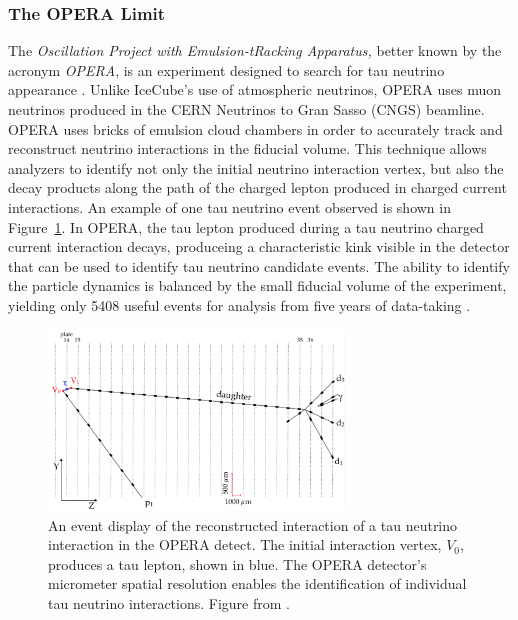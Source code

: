 \label{subsubsec:opera_limit}
\subsubsection{The OPERA Limit}
The \emph{Oscillation Project with Emulsion-tRacking Apparatus,} better known by the acronym \emph{OPERA}, is an experiment designed to search for tau neutrino appearance \cite{Description-OPERA}.
Unlike IceCube's use of atmospheric neutrinos, OPERA uses muon neutrinos produced in the CERN Neutrinos to Gran Sasso (CNGS) beamline.
OPERA uses bricks of emulsion cloud chambers in order to accurately track and reconstruct neutrino interactions in the fiducial volume.
This technique allows analyzers to identify not only the initial neutrino interaction vertex, but also the decay products along the path of the charged lepton produced in charged current interactions.
An example of one tau neutrino event observed is shown in Figure~\ref{fig:opera_event}.
In OPERA, the tau lepton produced during a tau neutrino charged current interaction decays, produceing a characteristic kink visible in the detector that can be used to identify tau neutrino candidate events.
The ability to identify the particle dynamics is balanced by the small fiducial volume of the experiment, yielding only 5408 useful events for analysis from five years of data-taking \cite{OPERA-Tau2015}.

\begin{figure}
\centering
\includegraphics[width=0.7\textwidth]{OPERA_event5.png} 
\caption[A tau neutrino event observed at OPERA]{An event display of the reconstructed interaction of a tau neutrino interaction in the OPERA detect. The initial interaction vertex, $V_0$, produces a tau lepton, shown in blue. The OPERA detector's micrometer spatial resolution enables the identification of individual tau neutrino interactions. Figure from \cite{OPERA-Tau2015}.}
\label{fig:opera_event}
\end{figure}

